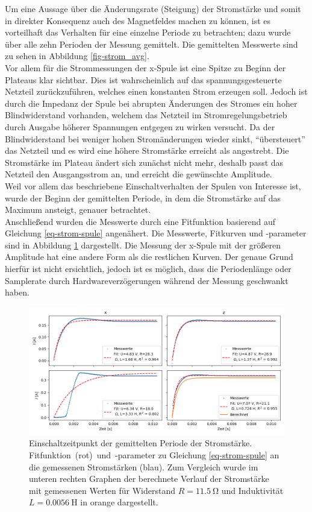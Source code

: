 \documentclass[page,pdftex,12pt,a4paper,twoside,openright]{scrbook}
\begin{document}
Um eine Aussage über die Änderungsrate (Steigung) der Stromstärke und somit in direkter Konsequenz auch des Magnetfeldes machen zu können, ist es vorteilhaft das Verhalten für eine einzelne Periode zu betrachten; dazu wurde über alle zehn Perioden der Messung gemittelt. Die gemittelten Messwerte sind zu sehen in Abbildung \ref{fig-strom_avg}.\\

Vor allem für die Strommessungen der x-Spule ist eine Spitze zu Beginn der Plateaus klar sichtbar. Dies ist wahrscheinlich auf das spannungsgesteuerte Netzteil zurückzuführen, welches einen konstanten Strom erzeugen soll. Jedoch ist durch die Impedanz der Spule bei abrupten Änderungen des Stromes ein hoher Blindwiderstand vorhanden, welchem das Netzteil im Stromregelungsbetrieb durch Ausgabe höherer Spannungen entgegen zu wirken versucht. Da der Blindwiderstand bei weniger hohen Stromänderungen wieder sinkt, "`übersteuert"' das Netzteil und es wird eine höhere Stromstärke erreicht als angestrebt. Die Stromstärke im Plateau ändert sich zunächst nicht mehr, deshalb passt das Netzteil den Ausgangsstrom an, und erreicht die gewünschte Amplitude.\\

Weil vor allem das beschriebene Einschaltverhalten der Spulen von Interesse ist, wurde der Beginn der gemittelten Periode, in dem die Stromstärke auf das Maximum ansteigt, genauer betrachtet.\\

Anschließend wurden die Messwerte durch eine Fitfunktion basierend auf Gleichung \ref{eq-strom-spule} angenähert. Die Messwerte, Fitkurven und -parameter sind in Abbildung \ref{fig-stromfit} dargestellt. Die Messung der x-Spule mit der größeren Amplitude hat eine andere Form als die restlichen Kurven. Der genaue Grund hierfür ist nicht ersichtlich, jedoch ist es möglich, dass die Periodenlänge oder Samplerate durch Hardwareverzögerungen während der Messung geschwankt haben.\\

\begin{figure}[h]
\centering
\includegraphics[width=\textwidth]{img/strom_fit.png}
\caption{\label{fig-stromfit}
Einschaltzeitpunkt der gemittelten Periode der Stromstärke. \mbox{Fitfunktion (rot) und -parameter} zu Gleichung \ref{eq-strom-spule} an die gemessenen Stromstärken (blau). Zum Vergleich wurde im unteren rechten Graphen der berechnete Verlauf der Stromstärke mit gemessenen Werten für Widerstand \(R = \SI{11.5}{\ohm}\) und Induktivität \(L = \SI{0.0056}{\henry}\) in orange dargestellt.}
\end{figure}
\end{document}
